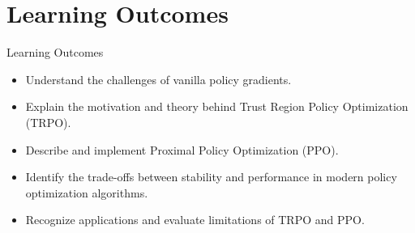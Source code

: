 \section{Learning Outcomes}
\begin{frame}{Learning Outcomes}
    \begin{itemize}
        \setlength{\itemsep}{1em}
        \item Understand the challenges of vanilla policy gradients.
        \item Explain the motivation and theory behind Trust Region Policy Optimization (TRPO).
        \item Describe and implement Proximal Policy Optimization (PPO).
        \item Identify the trade-offs between stability and performance in modern policy optimization algorithms.
        \item Recognize applications and evaluate limitations of TRPO and PPO.
    \end{itemize}
\end{frame}